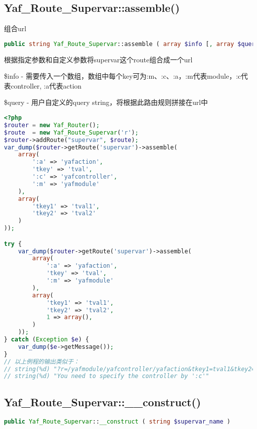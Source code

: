 \subsection{Yaf\_Route\_Supervar::assemble()}


组合url


\begin{lstlisting}[language=PHP]
public string Yaf_Route_Supervar::assemble ( array $info [, array $query ] )
\end{lstlisting}

根据指定参数和自定义参数将supervar这个route组合成一个url

\begin{compactitem}
\item \$info - 需要传入一个数组，数组中每个key可为:m、:c、:a，:m代表module，:c代表controller, :a代表action

\item \$query - 用户自定义的query string，将根据此路由规则拼接在url中

\end{compactitem}



\begin{lstlisting}[language=PHP]
<?php
$router = new Yaf_Router();
$route  = new Yaf_Route_Supervar('r');
$router->addRoute("supervar", $route);
var_dump($router->getRoute('supervar')->assemble(
    array(
        ':a' => 'yafaction',
        'tkey' => 'tval',
        ':c' => 'yafcontroller',
        ':m' => 'yafmodule'
    ),
    array(
        'tkey1' => 'tval1',
        'tkey2' => 'tval2'
    )
));

try {
    var_dump($router->getRoute('supervar')->assemble(
        array(
            ':a' => 'yafaction',
            'tkey' => 'tval',
            ':m' => 'yafmodule'
        ),
        array(
            'tkey1' => 'tval1',
            'tkey2' => 'tval2',
            1 => array(),
        )
    ));
} catch (Exception $e) {
    var_dump($e->getMessage());
}
// 以上例程的输出类似于：
// string(%d) "?r=/yafmodule/yafcontroller/yafaction&tkey1=tval1&tkey2=tval2"
// string(%d) "You need to specify the controller by ':c'"
\end{lstlisting}

\subsection{Yaf\_Route\_Supervar::\_\_construct()}

\begin{lstlisting}[language=PHP]
public Yaf_Route_Supervar::__construct ( string $supervar_name )
\end{lstlisting}

